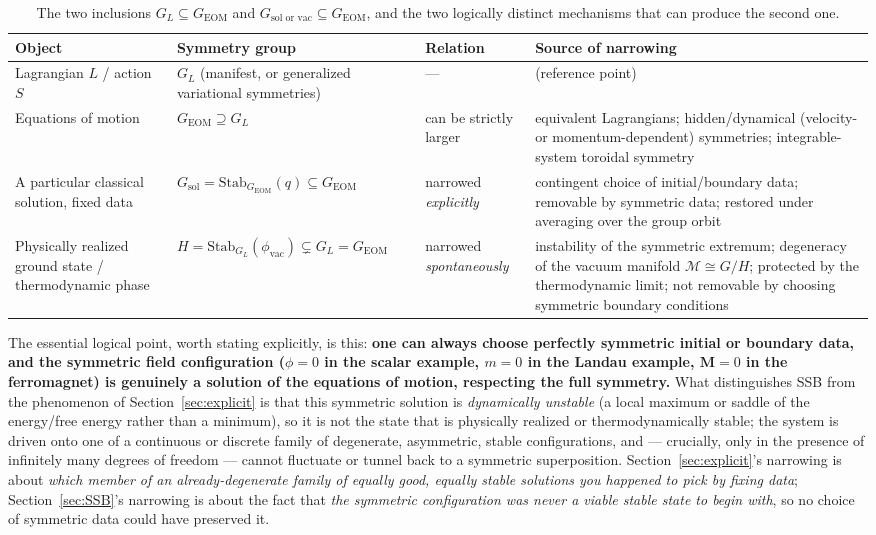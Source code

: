 \documentclass[11pt]{article}
\theoremstyle{definition}
\theoremstyle{remark}
\newcommand{\GEOM}{G_{\mathrm{EOM}}}
\newcommand{\GL}{G_{L}}
\newcommand{\Stab}{\mathrm{Stab}}
\begin{document}
\begin{table}[h]
\centering
\renewcommand{\arraystretch}{1.35}
\begin{tabular}{@{}p{2.7cm}p{4.6cm}p{3.3cm}p{4.4cm}@{}}
\toprule
\textbf{Object} & \textbf{Symmetry group} & \textbf{Relation} & \textbf{Source of narrowing} \\
\midrule
Lagrangian $L$ / action $S$ & $\GL$ (manifest, or generalized variational symmetries) & — & (reference point) \\
Equations of motion & $\GEOM \supseteq \GL$ & can be strictly larger & equivalent Lagrangians; hidden/dynamical (velocity- or momentum-dependent) symmetries; integrable-system toroidal symmetry \\
A particular classical solution, fixed data & $G_{\text{sol}} = \Stab_{\GEOM}(q) \subseteq \GEOM$ & narrowed \emph{explicitly} & contingent choice of initial/boundary data; removable by symmetric data; restored under averaging over the group orbit \\
Physically realized ground state / thermodynamic phase & $H = \Stab_{\GL}(\phi_{\text{vac}}) \subsetneq \GL=\GEOM$ & narrowed \emph{spontaneously} & instability of the symmetric extremum; degeneracy of the vacuum manifold $\mathcal M \cong G/H$; protected by the thermodynamic limit; not removable by choosing symmetric boundary conditions \\
\bottomrule
\end{tabular}
\caption{The two inclusions $\GL\subseteq\GEOM$ and $G_{\text{sol or vac}}\subseteq \GEOM$, and the two logically distinct mechanisms that can produce the second one.}
\end{table}

The essential logical point, worth stating explicitly, is this: \textbf{one can always choose perfectly symmetric initial or boundary data, and the symmetric field configuration ($\phi=0$ in the scalar example, $m=0$ in the Landau example, $\bm M=0$ in the ferromagnet) is genuinely a solution of the equations of motion, respecting the full symmetry.} What distinguishes SSB from the phenomenon of Section~\ref{sec:explicit} is that this symmetric solution is \emph{dynamically unstable} (a local maximum or saddle of the energy/free energy rather than a minimum), so it is not the state that is physically realized or thermodynamically stable; the system is driven onto one of a continuous or discrete family of degenerate, asymmetric, stable configurations, and — crucially, only in the presence of infinitely many degrees of freedom — cannot fluctuate or tunnel back to a symmetric superposition. Section~\ref{sec:explicit}'s narrowing is about \emph{which member of an already-degenerate family of equally good, equally stable solutions you happened to pick by fixing data}; Section~\ref{sec:SSB}'s narrowing is about the fact that \emph{the symmetric configuration was never a viable stable state to begin with}, so no choice of symmetric data could have preserved it.
\end{document}
